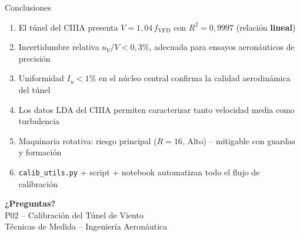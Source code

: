 \documentclass[aspectratio=169,12pt]{beamer}
\begin{document}
\begin{frame}{Conclusiones}
	\begin{enumerate}
		\item El túnel del CIIIA presenta $V = 1{,}04\,f_\mathrm{VFD}$ con
		      $R^2 = 0{,}9997$ (relación \textbf{lineal})
		\item Incertidumbre relativa $u_V/V < 0{,}3\%$, adecuada para ensayos
		      aeronáuticos de precisión
		\item Uniformidad $I_u < 1\%$ en el núcleo central confirma la calidad
		      aerodinámica del túnel
		\item Los datos LDA del CIIIA permiten caracterizar tanto velocidad
		      media como turbulencia
		\item Maquinaria rotativa: riesgo principal ($R = 16$, Alto) --
		      mitigable con guardas y formación
		\item \texttt{calib\_utils.py} + script + notebook automatizan todo
		      el flujo de calibración
	\end{enumerate}

	\vspace{0.3cm}
	\centering
\end{frame}

\begin{frame}{}
	\centering
	\vspace{2cm}
	{\Huge\color{aerogreen}\bfseries ¿Preguntas?}\\[1cm]
	{\large P02 -- Calibración del Túnel de Viento}\\[0.5cm]
	{\small Técnicas de Medida -- Ingeniería Aeronáutica}
\end{frame}
\end{document}
